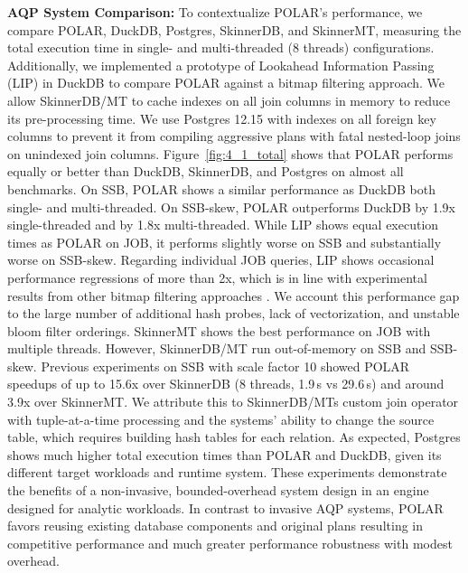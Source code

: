 \textbf{AQP System Comparison:} To contextualize POLAR's performance, we compare POLAR, DuckDB, Postgres, SkinnerDB, and SkinnerMT, measuring the total execution time in single- and multi-threaded (8 threads) configurations. Additionally, we implemented a prototype of Lookahead Information Passing~\cite{ZhuPSP17} (LIP) in DuckDB to compare POLAR against a bitmap filtering approach. We allow SkinnerDB/MT to cache indexes on all join columns in memory to reduce its pre-processing time. We use Postgres 12.15 with indexes on all foreign key columns to prevent it from compiling aggressive plans with fatal nested-loop joins on unindexed join columns.
%
Figure~\ref{fig:4_1_total} shows that POLAR performs equally or better than DuckDB, SkinnerDB, and Postgres on almost all benchmarks. On SSB, POLAR shows a similar performance as DuckDB both single- and multi-threaded. On SSB-skew, POLAR outperforms DuckDB by 1.9x single-threaded and by 1.8x multi-threaded.
While LIP shows equal execution times as POLAR on JOB, it performs slightly worse on SSB and substantially worse on SSB-skew. Regarding individual JOB queries, LIP shows occasional performance regressions of more than 2x, which is in line with experimental results from other bitmap filtering approaches \cite{DingCN20, LeeDNC23}. We account this performance gap to the large number of additional hash probes, lack of vectorization, and unstable bloom filter orderings.
SkinnerMT shows the best performance on JOB with multiple threads. However, SkinnerDB/MT run out-of-memory on SSB and SSB-skew. Previous experiments on SSB with scale factor 10 showed POLAR speedups of up to 15.6x over SkinnerDB (8 threads, 1.9\,s vs 29.6\,s) and around 3.9x over SkinnerMT. We attribute this to SkinnerDB/MTs custom join operator with tuple-at-a-time processing and the systems' ability to change the source table, which requires building hash tables for each relation.
As expected, Postgres shows much higher total execution times than POLAR and DuckDB, given its different target workloads and runtime system. These experiments demonstrate the benefits of a non-invasive, bounded-overhead system design in an engine designed for analytic workloads. In contrast to invasive AQP systems, POLAR favors reusing existing database components and original plans resulting in competitive performance and much greater performance robustness with modest overhead.
